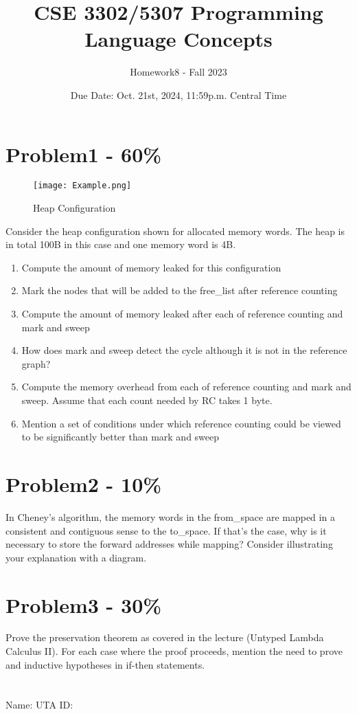 \documentclass{article}
\newcommand{\answerboxbig}{
    \vspace{20cm} %
}
\newcommand{\studentinfo}{
    \noindent Name: \underline{\hspace{5cm}} UTA ID: \underline{\hspace{5cm}}\\
    \vspace{0.5cm} %
}
\begin{document}
\title{CSE 3302/5307 Programming Language Concepts}
\author{Homework8 - Fall 2023}
\date{Due Date: Oct. 21st, 2024, 11:59p.m. Central Time}
\maketitle
\thispagestyle{fancy}


\section*{Problem1 - 60\%}

\FloatBarrier %
\begin{figure}[h]
    \centering
    \texttt{[image: Example.png]}
    \caption{Heap Configuration}
    \label{fig:example}
\end{figure}

\noindent
Consider the heap configuration shown for allocated memory words. The heap is in total 100B in this case and one memory word is 4B.
\begin{enumerate}[label=\alph*)]
    \item Compute the amount of memory leaked for this configuration
    \item Mark the nodes that will be added to the free\_list after reference counting
    \item Compute the amount of memory leaked after each of reference counting and mark and sweep
    \item How does mark and sweep detect the cycle although it is not in the reference graph?
    \item Compute the memory overhead from each of reference counting and mark and sweep. Assume that each count needed by RC takes 1 byte.
    \item Mention a set of conditions under which reference counting could be viewed to be significantly better than mark and sweep
\end{enumerate}

\answerboxbig

\newpage 
\mbox{}
\newpage 


\section*{Problem2 - 10\%}

In Cheney's algorithm, the memory words in the from\_space are mapped in a consistent and contiguous sense to the to\_space. If that's the case, why is it necessary to store the forward addresses while mapping? Consider illustrating your explanation with a diagram.



\newpage 


\section*{Problem3 - 30\%}
Prove the preservation theorem as covered in the lecture (Untyped Lambda Calculus II). For each case where the proof proceeds, mention the need to prove and inductive hypotheses in if-then statements. 


\section*{}
\answerboxbig

\studentinfo
\end{document}
